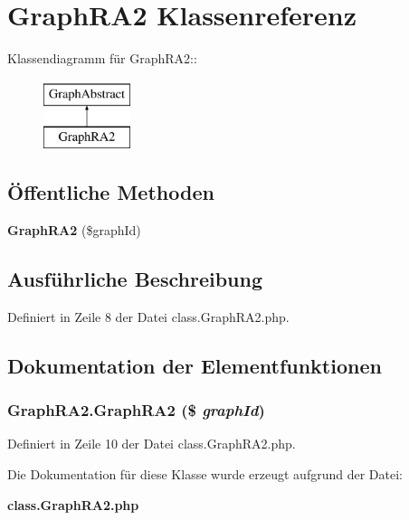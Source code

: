 \section{GraphRA2 Klassenreferenz}
\label{classGraphRA2}
Klassendiagramm für GraphRA2::\begin{figure}[H]
\begin{center}
\leavevmode
\includegraphics[height=2cm]{classGraphRA2}
\end{center}
\end{figure}
\subsection*{Öffentliche Methoden}
\begin{CompactItemize}
\item 
{\bf GraphRA2} (\$graphId)
\end{CompactItemize}


\subsection{Ausführliche Beschreibung}


Definiert in Zeile 8 der Datei class.GraphRA2.php.

\subsection{Dokumentation der Elementfunktionen}
\subsubsection{\setlength{\rightskip}{0pt plus 5cm}GraphRA2.GraphRA2 (\$ {\em graphId})}\label{classGraphRA2_d0344436a7a552f471eb48f58282402c}




Definiert in Zeile 10 der Datei class.GraphRA2.php.

Die Dokumentation für diese Klasse wurde erzeugt aufgrund der Datei:\begin{CompactItemize}
\item 
{\bf class.GraphRA2.php}\end{CompactItemize}
